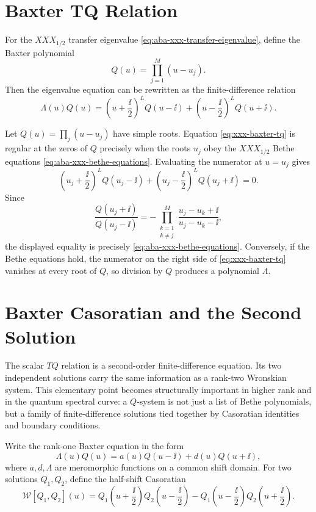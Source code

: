 \section{Baxter TQ Relation}

For the \(XXX_{1/2}\) transfer eigenvalue
\eqref{eq:aba-xxx-transfer-eigenvalue}, define the Baxter polynomial
\[
  Q(u)=\prod_{j=1}^M(u-u_j).
\]
Then the eigenvalue equation can be rewritten as the finite-difference
relation
\begin{equation}
  \Lambda(u)Q(u)
  =
  \left(u+\frac{\ii}{2}\right)^L Q(u-\ii)
  +
  \left(u-\frac{\ii}{2}\right)^L Q(u+\ii).
  \label{eq:xxx-baxter-tq}
\end{equation}

Let \(Q(u)=\prod_j(u-u_j)\) have simple roots.  Equation
\eqref{eq:xxx-baxter-tq} is regular at the zeros of \(Q\) precisely when
the roots \(u_j\) obey the \(XXX_{1/2}\) Bethe equations
\eqref{eq:aba-xxx-bethe-equations}.  Evaluating the numerator at
\(u=u_j\) gives
\[
  \left(u_j+\frac{\ii}{2}\right)^L Q(u_j-\ii)
  +
  \left(u_j-\frac{\ii}{2}\right)^L Q(u_j+\ii)=0.
\]
Since
\[
  \frac{Q(u_j+\ii)}{Q(u_j-\ii)}
  =
  -\prod_{\substack{k=1\\ k\neq j}}^M
  \frac{u_j-u_k+\ii}{u_j-u_k-\ii},
\]
the displayed equality is precisely
\eqref{eq:aba-xxx-bethe-equations}.  Conversely, if the Bethe equations hold,
the numerator on the right side of \eqref{eq:xxx-baxter-tq} vanishes at every
root of \(Q\), so division by \(Q\) produces a polynomial \(\Lambda\).

\section{Baxter Casoratian and the Second Solution}
\label{sec:baxter-casoratian-second-solution}

The scalar \(TQ\) relation is a second-order finite-difference equation.  Its
two independent solutions carry the same information as a rank-two
Wronskian system.  This elementary point becomes structurally important in
higher rank and in the quantum spectral curve: a \(Q\)-system is not just a
list of Bethe polynomials, but a family of finite-difference solutions tied
together by Casoratian identities and boundary conditions.

Write the rank-one Baxter equation in the form
\begin{equation}
  \Lambda(u)Q(u)
  =
  a(u)Q(u-\ii)+d(u)Q(u+\ii),
  \label{eq:rank-one-baxter-general-ad}
\end{equation}
where \(a,d,\Lambda\) are meromorphic functions on a common shift domain.
For two solutions \(Q_1,Q_2\), define the half-shift Casoratian
\begin{equation}
  \mathcal W[Q_1,Q_2](u)
  =
  Q_1\!\left(u+\frac{\ii}{2}\right)
  Q_2\!\left(u-\frac{\ii}{2}\right)
  -
  Q_1\!\left(u-\frac{\ii}{2}\right)
  Q_2\!\left(u+\frac{\ii}{2}\right).
  \label{eq:baxter-casoratian-definition}
\end{equation}

